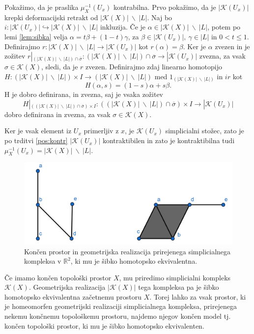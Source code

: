 \documentclass[mat1]{fmfdelo}
\newcommand{\R}{\mathbb R}
\begin{document}
\begin{dokaz}
    Pokažimo, da je praslika $\mu_X^{-1}(U_x)$ kontrabilna. Prvo pokažimo, da je 
    $|\mathcal{K}(U_x)|$ krepki deformacijski retrakt 
    od $|\mathcal{K}(X)|\ \backslash \ |L|$. Naj bo $i\colon |\mathcal{K}(U_x)|\hookrightarrow |\mathcal{K}
    (X)|\ \backslash \ |L|$ inkluzija. Če je $\alpha \in |\mathcal{K}(X)|\ 
    \backslash \ |L|$, potem po lemi \ref{lem:sibka} velja  $\alpha = t\beta + 
    (1-t)\gamma$, za $\beta \in |\mathcal{K}(U_x)|, \ \gamma \in |L|$ in $0<t\leq 1$. 
    Definirajmo $r\colon |\mathcal{K}(X)|\ \backslash \ |L|\rightarrow |\mathcal{K}(U_x)|$ 
    kot $r(\alpha)=\beta$. Ker je $\alpha$ zvezen in je zožitev $r|_{(|\mathcal{K}(X)|\ \backslash \ |L|)\cap 
    \overline{\sigma}}\colon (|\mathcal{K}(X)|\ \backslash \ |L|)\cap 
    \overline{\sigma} \rightarrow |\mathcal{K}(U_x)|$ zvezna, za vsak 
    $\sigma \in \mathcal{K}(X)$, sledi, da je $r$ zvezen. Definirajmo zdaj linearno homotopijo $H\colon (|\mathcal{K}(X)|\ \backslash \ |L|) \times I \rightarrow (|\mathcal{K}(X)|\ \backslash \ |L|)$ med $1_{(|\mathcal{K}(X)|\ \backslash \ |L|)}$ in $ir$ kot 
    $$
    H(\alpha,s)=(1-s)\alpha + s\beta.
    $$
    H je dobro definirana, in zvezna, saj je vsaka zožitev 
    $$
    H|_{((|\mathcal{K}(X)|\ \backslash \ |L|)\cap 
    \overline{\sigma})\times I}\colon ((|\mathcal{K}(X)|\ \backslash \ |L|)\cap 
    \overline{\sigma})\times I \rightarrow |\mathcal{K}(U_x)|
    $$
    dobro definirana in zvezna, za vsak $\sigma \in \mathcal{K}(X)$.

    Ker je vsak element iz $U_x$ primerljiv z $x$, je $\mathcal{K}(U_x)$ 
    simplicialni stožec, zato je po trditvi \ref{pos:kontr} $|\mathcal{K}(U_x)|$ 
    kontraktibilen in zato je kontraktibilna tudi $\mu_X^{-1}
    (U_x)=|\mathcal{K}(X)|\ \backslash \ |L|$.
\end{dokaz}


\begin{figure}[h]
    \centering
    \includegraphics[width=1\linewidth]{simp.png}
    \caption{Končen prostor in geometrijska realizacija prirejenega simplicialnega kompleksa v $\R^2$, ki mu je šibko homotopsko ekvivalentna.}
\end{figure}
Če imamo končen topološki prostor $X$, mu priredimo simplicialni kompleks
$\mathcal{K}(X)$. Geometrijska realizacija $|\mathcal{K}(X)|$ tega kompleksa pa je šibko homotopsko ekvivalentna 
začetnemu prostoru $X$. Torej lahko za vsak prostor, ki je homeomorfen geometrijski realizaciji
 simplicialnega kompleksa, prirejenega nekemu končnemu topološkemu prostoru, najdemo njegov končen model tj. končen topološki prostor, ki mu
je šibko homotopsko ekvivalenten.
\end{document}
